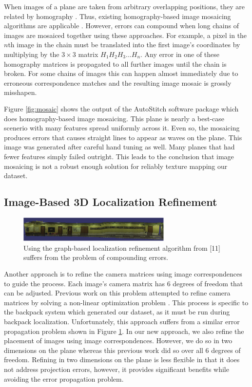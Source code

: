 \documentclass[10pt,twocolumn,letterpaper]{article}
\begin{document}
When images of a plane are taken from arbitrary overlapping positions,
they are related by homography \cite{hz}. Thus, existing
homography-based image mosaicing algorithms are applicable
\cite{brown2007automatic}. However, errors can compound when long
chains of images are mosaiced together using these approaches. For
example, a pixel in the $n$th image in the chain must be translated
into the first image's coordinates by multiplying by the $3\times3$
matrix $H_1 H_2 H_3 ... H_n$. Any error in one of these homography
matrices is propagated to all further images until the chain is
broken. For some chains of images this can happen almost immediately
due to erroneous correspondence matches and the resulting image mosaic
is grossly misshapen.

Figure \ref{fig:mosaic} shows the output of the AutoStitch software
package which does homography-based image mosaicing. This plane is
nearly a best-case scenerio with many features spread uniformly across
it. Even so, the mosaicing produces errors that causes straight lines
to appear as waves on the plane. This image was generated after
careful hand tuning as well. Many planes that had fewer features
simply failed outright. This leads to the conclusion that image
mosaicing is not a robust enough solution for reliably texture mapping
our dataset.

\subsection{Image-Based 3D Localization Refinement}

\begin{figure}
  \centering
  \includegraphics[width=3in]{Graph_crop.pdf}
  \caption{Using the graph-based localization refinement algorithm
    from [11] suffers from the problem of compounding errors. }
  \label{fig:graph}
\end{figure}

Another approach is to refine the camera matrices using image
correspondences to guide the process. Each image's camera matrix has 6
degrees of freedom that can be adjusted. Previous work on this problem
attempted to refine camera matrices by solving a non-linear
optimization problem \cite{liu2010indoor}. This process is specific to
the backpack system which generated our dataset, as it must be run
during backpack
localization\cite{liu2010indoor,chen2010indoor}. Unfortunately, this
approach suffers from a similar error propagation problem shown in
Figure \ref{fig:graph}. In our new approach, we also refine the
placement of images using image correspondences. However, we do so in
two dimensions on the plane whereas this previous work did so over all
6 degrees of freedom. Refining in two dimensions on the plane is less
flexible in that it does not address projection errors, however, it
provides significant benefits while avoiding the error propagation
problem.
\end{document}
